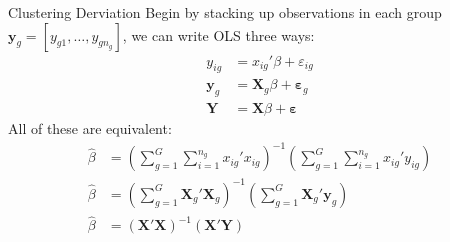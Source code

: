 \documentclass[aspectratio=169,11pt]{beamer}
\begin{document}







\begin{frame}{Clustering Derviation}
Begin by stacking up observations in each group $\mathbf{y}_{g }  = [y_{g1},\ldots,y_{g n_g}]$, we can write OLS three ways:
\begin{align*}
y_{ig } &= x_{ig}' \beta + \varepsilon_{ig}\\
\mathbf{y}_{g } &= \mathbf{X}_{g} \beta + \boldsymbol{\varepsilon}_{g}\\
\mathbf{Y} &= \mathbf{X} \beta + \boldsymbol{\varepsilon}
\end{align*}
All of these are equivalent:
\begin{align*}
\widehat {  \beta  } &= \left( \sum _ { g = 1 } ^ { G } \sum _ { i = 1 } ^ { n _ { g } } x _ { i g }' { x } _ { i g } \right) ^ { - 1 } \left( \sum _ { g = 1 } ^ { G } \sum _ { i = 1 } ^ { n _ { g } } x _ { i g }' y _ { i g } \right)\\
\widehat {  \beta  }  &=  \left(  \sum _ { g = 1 } ^ { G } \mathbf{X}_g' \mathbf{X}_g \right)^{-1} \left(  \sum _ { g = 1 } ^ { G } \mathbf{X}_g' \mathbf{y}_g \right)\\
\widehat {  \beta  }  &=  \left( \mathbf{X}' \mathbf{X} \right)^{-1} \left(   \mathbf{X}' \mathbf{Y} \right)\\
\end{align*}
\end{frame}
\end{document}

